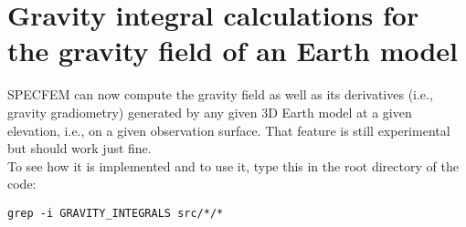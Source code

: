 \chapter{Gravity integral calculations for the gravity field of an Earth model}


SPECFEM can now compute the gravity field as well as its derivatives (i.e., gravity gradiometry)
generated by any given 3D Earth model at a given elevation, i.e., on a given observation surface.
That feature is still experimental but should work just fine.\\

To see how it is implemented and to use it, type this in the root directory of the code:
\begin{verbatim}
grep -i GRAVITY_INTEGRALS src/*/*
\end{verbatim}


